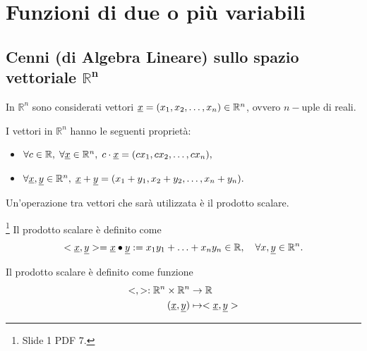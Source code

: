 \section{Funzioni di due o più variabili}
\subsection{Cenni (di Algebra Lineare) sullo spazio vettoriale \texorpdfstring{$\boldsymbol{\mathbb R^n}$}{Rn}}
In $\mathbb R^n$ sono considerati vettori $\uline x=(x_1,x_2,\hdots,x_n)\in \mathbb R^n$, ovvero $n-$uple di reali.

\begin{property}
    I vettori in $\mathbb R^n$ hanno le seguenti proprietà:
    \begin{itemize}
        \item $\forall c\in\mathbb R,\; \forall\uline x\in\mathbb R^n,\; c\cdot\uline x=(cx_1,cx_2,\hdots,cx_n),$
        \item $\forall\uline x,\uline y\in\mathbb R^n,\; \uline x+\uline y= (x_1+y_1,x_2+y_2,\hdots,x_n+y_n).$
    \end{itemize}
\end{property}

Un'operazione tra vettori che sarà utilizzata è il prodotto scalare.
\begin{definition}\footnote{Slide 1 PDF 7.}
    Il prodotto scalare è definito come
    \begin{equation*}
        <\uline x,\uline y> = \uline x \bullet \uline y := x_1y_1+\hdots+x_ny_n\in\mathbb R,\quad \forall\mathbb\uline x, \uline y\in\mathbb R^n.
    \end{equation*}
\end{definition}
\begin{remark}
    Il prodotto scalare è definito come funzione
    \begin{align*}
        <,>:\mathbb R^n\times\mathbb R^n &\rightarrow\mathbb R\\
        (\uline x,\uline y) &\mapsto <\uline x,\uline y>
    \end{align*}
\end{remark}

